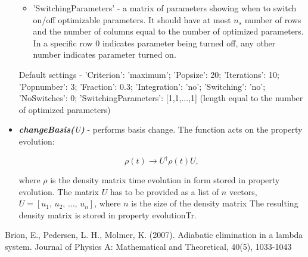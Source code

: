\documentclass{article}
\numberwithin{equation}{section}
\numberwithin{figure}{section}
\numberwithin{table}{section}
\newcommand\codefun[2]{\textit{\textbf{#1(}#2\textbf{)}}}
\newcommand\codevar[1]{\ttfamily #1\rmfamily}
\begin{document}
\begin{itemize}
\begin{itemize}
\item 'SwitchingParameters' - a matrix of parameters showing when to switch on/off optimizable parameters. It should have at most $n_s$ number of rows and the number of columns equal to the number of optimized parameters. In a specific row 0 indicates parameter being turned off, any other number indicates parameter turned on.

\end{itemize}

\noindent Default settings - 'Criterion': 'maximum'; 'Popsize': 20; 'Iterations': 10; 'Popnumber': 3; 'Fraction': 0.3; 'Integration': 'no'; 'Switching': 'no'; 'NoSwitches': 0; 'SwitchingParameters': [1,1,...,1] (length equal to the number of optimized parameters)


\item \codefun{changeBasis}{U} - performs basis change. The function acts on the property \codevar{evolution}:

\begin{displaymath}
\rho(t)\rightarrow U^{\dagger}\rho(t) U,
\end{displaymath}

where $\rho$ is the density matrix time evolution in form stored in property \codevar{evolution}. The matrix $U$ has to be provided as a list of $n$ vectors, $U=[u_1,\,u_2,\,\ldots,\,u_n]$, where $n$ is the size of the density matrix The resulting density matrix is stored in property \codevar{evolutionTr}.


\end{itemize}

\begin{thebibliography}{9}
Brion, E., Pedersen, L. H., Molmer, K. (2007). Adiabatic elimination in a lambda system. Journal of Physics A: Mathematical and Theoretical, 40(5), 1033-1043

\end{thebibliography}
\end{document}
